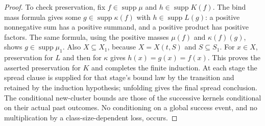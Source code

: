 \begin{proof}
To check preservation, fix $f\in\operatorname{supp}\mu$ and
$h\in\operatorname{supp}K(f)$.  The bind mass formula gives some
$g\in\operatorname{supp}\kappa(f)$ with $h\in\operatorname{supp}L(g)$:
a positive nonnegative sum has a positive summand, and a positive product
has positive factors.  The same formula, using the positive masses
$\mu(f)$ and $\kappa(f)(g)$, shows $g\in\operatorname{supp}\mu_1$.
Also $X\subseteq X_1$, because $X=X(t,S)$ and $S\subseteq S_1$.
For $x\in X$, preservation for $L$ and then for $\kappa$ gives
$h(x)=g(x)=f(x)$.  This proves the asserted preservation for $K$ and completes
the finite induction.  At each stage the spread clause is supplied for that
stage's bound law by the transition and retained by the induction hypothesis;
unfolding  gives the final spread conclusion.
The conditional new-cluster bounds are those of the successive kernels
conditional on their actual past outcomes.  No conditioning on a global
success event, and no multiplication by a class-size-dependent loss, occurs.
\end{proof}
